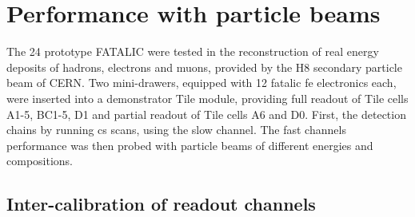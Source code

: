 \section{Performance with particle beams}
\label{sec:TestBeamResults}

The 24 prototype FATALIC were tested in the reconstruction of real energy deposits of hadrons, electrons and muons,
provided by the H8 secondary particle beam of CERN. Two mini-drawers, equipped with 12 \gls{fatalic} \gls{fe} electronics 
each, were inserted into a demonstrator Tile module, providing full readout of Tile cells A1-5, BC1-5, D1 and partial readout
of Tile cells A6 and D0. First, the detection chains by running \gls{cs} scans, using the slow channel. The fast channels 
performance was then probed with particle beams of different energies and compositions.



\subsection{Inter-calibration of readout channels}
\label{subsec:Calibration}

